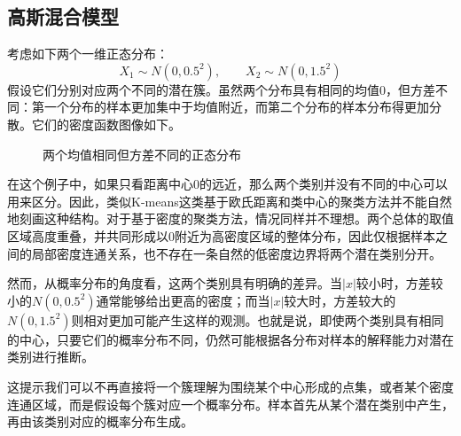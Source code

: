 \subsection{高斯混合模型}
考虑如下两个一维正态分布：
\begin{equation*}
	X_1\sim N(0,0.5^2),\qquad X_2\sim N(0,1.5^2)
\end{equation*}
假设它们分别对应两个不同的潜在簇。虽然两个分布具有相同的均值$0$，但方差不同：第一个分布的样本更加集中于均值附近，而第二个分布的样本分布得更加分散。它们的密度函数图像如下。
\begin{figure}[H]
	\centering
	\caption{两个均值相同但方差不同的正态分布}
\end{figure}
在这个例子中，如果只看距离中心$0$的远近，那么两个类别并没有不同的中心可以用来区分。因此，类似K-means这类基于欧氏距离和类中心的聚类方法并不能自然地刻画这种结构。对于基于密度的聚类方法，情况同样并不理想。两个总体的取值区域高度重叠，并共同形成以$0$附近为高密度区域的整体分布，因此仅根据样本之间的局部密度连通关系，也不存在一条自然的低密度边界将两个潜在类别分开。\par
然而，从概率分布的角度看，这两个类别具有明确的差异。当$|x|$较小时，方差较小的$N(0,0.5^2)$通常能够给出更高的密度；而当$|x|$较大时，方差较大的$N(0,1.5^2)$则相对更加可能产生这样的观测。也就是说，即使两个类别具有相同的中心，只要它们的概率分布不同，仍然可能根据各分布对样本的解释能力对潜在类别进行推断。\par
这提示我们可以不再直接将一个簇理解为围绕某个中心形成的点集，或者某个密度连通区域，而是假设每个簇对应一个概率分布。样本首先从某个潜在类别中产生，再由该类别对应的概率分布生成。
